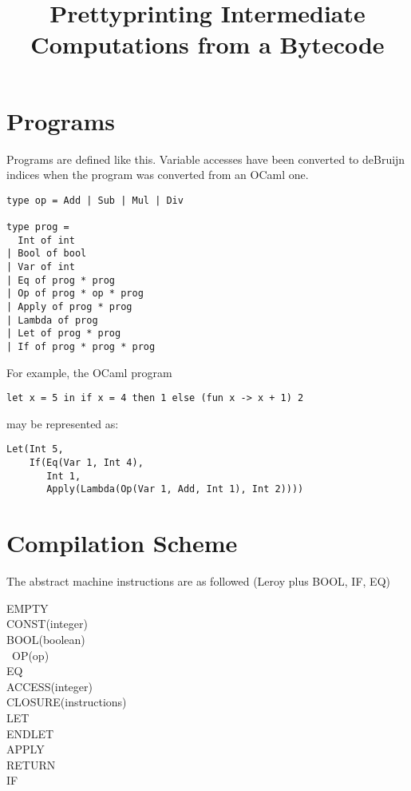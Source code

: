 \documentclass[11pt]{article}
\begin{document}
\title{Prettyprinting Intermediate Computations from a Bytecode}
\maketitle


\section{Programs}

Programs are defined like this. Variable accesses have been converted to deBruijn indices when the program was converted from an OCaml one.

{\small\begin{verbatim}
type op = Add | Sub | Mul | Div

type prog =
  Int of int
| Bool of bool
| Var of int
| Eq of prog * prog
| Op of prog * op * prog
| Apply of prog * prog
| Lambda of prog
| Let of prog * prog
| If of prog * prog * prog\end{verbatim}}

\noindent For example, the OCaml program

\medskip
\noindent\texttt{let x = 5 in if x = 4 then 1 else (fun x -> x + 1) 2}
\medskip

\noindent may be represented as:

\medskip
{\small
\begin{verbatim}Let(Int 5,
    If(Eq(Var 1, Int 4),
       Int 1,
       Apply(Lambda(Op(Var 1, Add, Int 1), Int 2))))\end{verbatim}}


\section{Compilation Scheme}

The abstract machine instructions are as followed (Leroy plus BOOL, IF, EQ)

\medskip

\noindent
EMPTY\\
CONST(integer)\\
BOOL(boolean)\\\
OP(op)\\
EQ\\
ACCESS(integer)\\
CLOSURE(instructions)\\
LET\\
ENDLET\\
APPLY\\
RETURN\\
IF
\medskip
\end{document}
